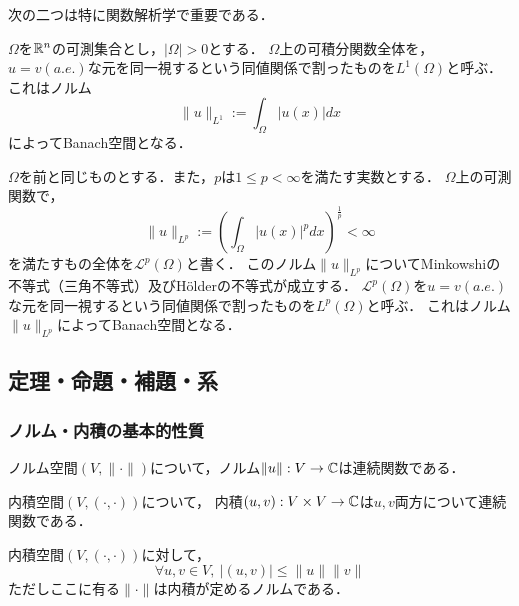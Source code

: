 \documentclass[a4j]{jarticle}
\begin{document}
        次の二つは特に関数解析学で重要である．
        \begin{Example}[\S 2.3, p.37-40]
            $\Omega$を$\mathbb{R}^n$の可測集合とし，$|\Omega|>0$とする．
            $\Omega$上の可積分関数全体を，
            $u=v (a.e.)$な元を同一視するという同値関係で割ったものを$L^1(\Omega)$と呼ぶ．
            これはノルム\[ \|u\|_{L^1}:=\int_{\Omega}{|u(x)|dx} \]によってBanach空間となる．
        \end{Example}
        \begin{Example}[\S 2.4, p.40-45]
            $\Omega$を前と同じものとする．また，$p$は$1 \leq p < \infty$を満たす実数とする．
            $\Omega$上の可測関数で，
            \[ \|u\|_{L^p}:=\left( \int_{\Omega}{|u(x)|^p dx} \right)^{\frac{1}{p}} < \infty \]
            を満たすもの全体を$\mathscr{L}^p(\Omega)$と書く．
            このノルム$\|u\|_{L^p}$についてMinkowshiの不等式（三角不等式）及びH\"olderの不等式が成立する．
            $\mathscr{L}^p(\Omega)$を$u=v (a.e.)$な元を同一視するという同値関係で割ったものを$L^p(\Omega)$と呼ぶ．
            これはノルム$\|u\|_{L^p}$によってBanach空間となる．
        \end{Example}

    \subsection{定理・命題・補題・系}
    \subsubsection{ノルム・内積の基本的性質}
    \begin{Them}
        ノルム空間$(V, \| \cdot \|)$について，ノルム$\|u\|: V \to \mathbb{C}$は連続関数である．
    \end{Them}
    \begin{Them}[定理1.24, p.14]
        内積空間$(V, (\cdot, \cdot))$について，
        内積$(u, v): V \times V \to \mathbb{C}$は$u,v$両方について連続関数である．
    \end{Them}
    \begin{Them}[Schwarzの不等式, 定理1.21, p.13]
        内積空間$(V, (\cdot, \cdot))$に対して，
        \[ \forall u, v \in V,~ |(u,v)| \leq \|u\|\|v\| \]
        ただしここに有る$\| \cdot \|$は内積が定めるノルムである．
    \end{Them}
\end{document}

